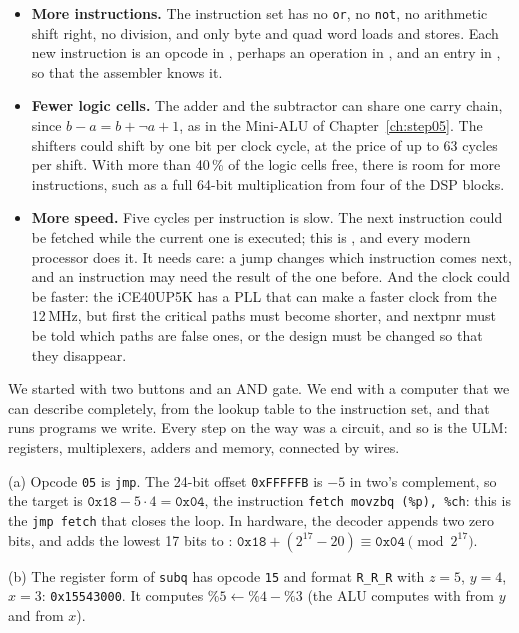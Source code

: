 \begin{itemize}
\item \textbf{More instructions.} The instruction set has no \texttt{or},
  no \texttt{not}, no arithmetic shift right, no division, and only byte and
  quad word loads and stores. Each new instruction is an opcode in
  , perhaps an operation in , and an entry
  in , so that the assembler knows it.
\item \textbf{Fewer logic cells.} The adder and the subtractor can share one
  carry chain, since $b - a = b + \neg a + 1$, as in the Mini-ALU of
  Chapter~\ref{ch:step05}. The shifters could shift by one bit
  per clock cycle, at the price of up to 63 cycles per shift. With more than
  40\,\% of the logic cells free, there is room for more instructions, such
  as a full 64-bit multiplication from four of the DSP blocks.
\item \textbf{More speed.} Five cycles per instruction is slow. The next
  instruction could be fetched while the current one is executed; this is
  , and every modern processor does it. It needs care: a
  jump changes which instruction comes next, and an instruction may need the
  result of the one before. And the clock could be faster: the iCE40UP5K has a
  PLL that can make a faster clock from the 12\,MHz, but first the critical
  paths must become shorter, and nextpnr must be told which paths are false
  ones, or the design must be changed so that they disappear.
\end{itemize}

We started with two buttons and an AND gate. We end with a computer that
we can describe completely, from the lookup table to the instruction set,
and that runs programs we write. Every step on the way was a circuit, and so
is the ULM: registers, multiplexers, adders and memory, connected by wires.

\solutions

\solution
(a) Opcode \texttt{05} is \texttt{jmp}. The 24-bit offset \texttt{0xFFFFFB}
is $-5$ in two's complement, so the target is $\texttt{0x18} - 5\cdot 4 =
\texttt{0x04}$, the instruction \texttt{fetch movzbq (\%p), \%ch}: this is the
\texttt{jmp fetch} that closes the loop. In hardware, the decoder appends two
zero bits, and  adds the lowest 17 bits to : $\texttt{0x18}
+ (2^{17} - 20) \equiv \texttt{0x04} \pmod{2^{17}}$.

(b) The register form of \texttt{subq} has opcode \texttt{15} and format
\texttt{R\_R\_R} with $z = 5$, $y = 4$, $x = 3$: \texttt{0x15543000}. It
computes $\%5 \gets \%4 - \%3$ (the ALU computes  with  from
$y$ and  from $x$).

